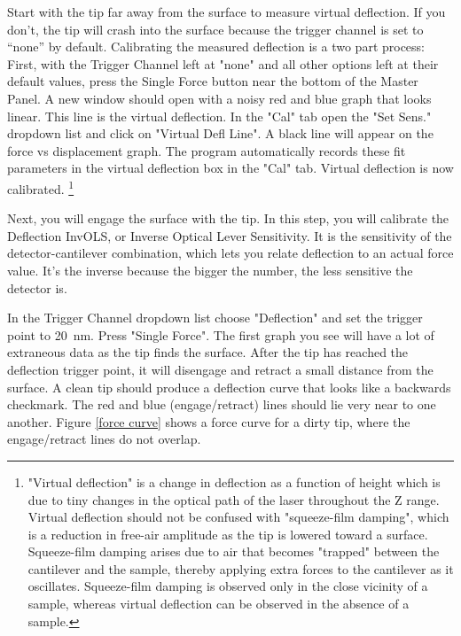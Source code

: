 \documentclass[double,12pt,1in,seploa]{beavtex}
\begin{document}
Start with the tip far away from the surface to measure virtual deflection. If you don't, the tip will crash into the surface because the trigger channel is set to “none” by default. Calibrating the measured deflection is a two part process: First, with the Trigger Channel left at "none" and all other options left at their default values, press the Single Force button near the bottom of the Master Panel. A new window should open with a noisy red and blue graph that looks linear. This line is the virtual deflection. In the "Cal" tab open the "Set Sens." dropdown list and click on "Virtual Defl Line". A black line will appear on the force vs displacement graph. The program automatically records these fit parameters in the virtual deflection box in the "Cal" tab. Virtual deflection is now calibrated. \footnote{"Virtual deflection" is a change in deflection as a function of height which is due to tiny changes in the optical path of the laser throughout the Z range. Virtual deflection should not be confused with "squeeze-film damping", which is a reduction in free-air amplitude as the tip is lowered toward a surface. Squeeze-film damping arises due to air that becomes "trapped" between the cantilever and the sample, thereby applying extra forces to the cantilever as it oscillates. Squeeze-film damping is observed only in the close vicinity of a sample, whereas virtual deflection can be observed in the absence of a sample.}
        
Next, you will engage the surface with the tip. In this step, you will calibrate the Deflection InvOLS, or Inverse Optical Lever Sensitivity. It is the sensitivity of the detector-cantilever combination, which lets you relate deflection to an actual force value. It's the inverse because the bigger the number, the less sensitive the detector is. 

In the Trigger Channel dropdown list choose "Deflection" and set the trigger point to \SI{20}{\nano\meter}. Press "Single Force". The first graph you see will have a lot of extraneous data as the tip finds the surface. After the tip has reached the deflection trigger point, it will disengage and retract a small distance from the surface. A clean tip should produce a deflection curve that looks like a backwards checkmark. The red and blue (engage/retract) lines should lie very near to one another. Figure \ref{force curve} shows a force curve for a dirty tip, where the engage/retract lines do not overlap.
\end{document}

